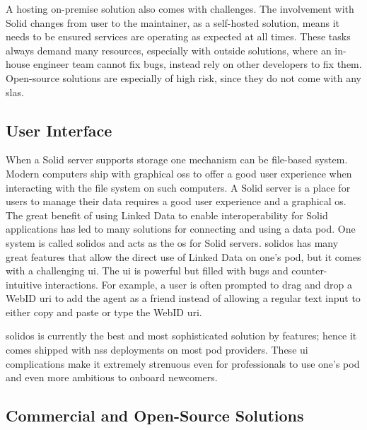 A hosting on-premise solution also comes with challenges. The involvement with Solid changes from user to the maintainer, as a self-hosted solution, means it needs to be ensured services are operating as expected at all times. These tasks always demand many resources, especially with outside solutions, where an in-house engineer team cannot fix bugs, instead rely on other developers to fix them. Open-source solutions are especially of high risk, since they do not come with any \glspl{sla}.

\subsection{User Interface}

When a Solid server supports storage one mechanism can be file-based system. Modern computers ship with graphical \glspl{os} to offer a good user experience when interacting with the file system on such computers. A Solid server is a place for users to manage their data requires a good user experience and a graphical \gls{os}. The great benefit of using Linked Data to enable interoperability for Solid applications has led to many solutions for connecting and using a data pod. One system is called \gls{solidos} \cite{solidos} and acts as the \gls{os} for Solid servers. \gls{solidos} has many great features that allow the direct use of Linked Data on one's pod, but it comes with a challenging \gls{ui}. The \gls{ui} is powerful but filled with bugs and counter-intuitive interactions. For example, a user is often prompted to drag and drop a WebID \gls{uri} to add the agent as a friend instead of allowing a regular text input to either copy and paste or type the WebID \gls{uri}.

\gls{solidos} is currently the best and most sophisticated solution by features; hence it comes shipped with \gls{nss} deployments on most pod providers. These \gls{ui} complications make it extremely strenuous even for professionals to use one's pod and even more ambitious to onboard newcomers.

\subsection{Commercial and Open-Source Solutions}

